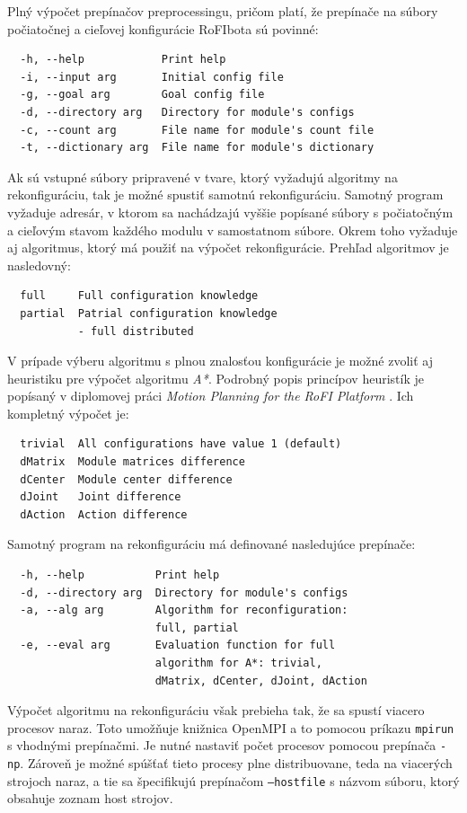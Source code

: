 \documentclass[
  digital, %
  oneside, %
  table,   %
  lof,     %
  nolot,     %
]{fithesis3}
\begin{document}
Plný výpočet prepínačov preprocessingu, pričom platí, že prepínače na súbory počiatočnej a cieľovej konfigurácie RoFIbota sú povinné: 
\begin{verbatim}
  -h, --help            Print help
  -i, --input arg       Initial config file
  -g, --goal arg        Goal config file
  -d, --directory arg   Directory for module's configs
  -c, --count arg       File name for module's count file
  -t, --dictionary arg  File name for module's dictionary
\end{verbatim}

Ak sú vstupné súbory pripravené v tvare, ktorý vyžadujú algoritmy na rekonfiguráciu, tak je možné spustiť samotnú rekonfiguráciu. Samotný program vyžaduje adresár, v ktorom sa nachádzajú vyššie popísané súbory s počiatočným a cieľovým stavom každého modulu v samostatnom súbore. Okrem toho vyžaduje aj algoritmus, ktorý má použiť na výpočet rekonfigurácie. Prehľad algoritmov je nasledovný: 

\begin{verbatim}
  full     Full configuration knowledge
  partial  Patrial configuration knowledge 
           - full distributed
\end{verbatim}

V prípade výberu algoritmu s plnou znalosťou konfigurácie je možné zvoliť aj heuristiku pre výpočet algoritmu \textit{A*}. Podrobný popis princípov heuristík je popísaný v diplomovej práci \textit{Motion Planning for the RoFI Platform} \cite{vozarovaMasterThesis}. Ich kompletný výpočet je: 

\begin{verbatim}
  trivial  All configurations have value 1 (default)
  dMatrix  Module matrices difference
  dCenter  Module center difference
  dJoint   Joint difference
  dAction  Action difference
\end{verbatim}

Samotný program na rekonfiguráciu má definované nasledujúce prepínače: 

\begin{verbatim}
  -h, --help           Print help
  -d, --directory arg  Directory for module's configs
  -a, --alg arg        Algorithm for reconfiguration: 
                       full, partial
  -e, --eval arg       Evaluation function for full 
                       algorithm for A*: trivial, 
                       dMatrix, dCenter, dJoint, dAction
\end{verbatim}

Výpočet algoritmu na rekonfiguráciu však prebieha tak, že sa spustí viacero procesov naraz. Toto umožňuje knižnica OpenMPI a to pomocou príkazu \texttt{mpirun} s vhodnými prepínačmi. Je nutné nastaviť počet procesov pomocou prepínača \texttt{-np}. Zároveň je možné spúšťať tieto procesy plne distribuovane, teda na viacerých strojoch naraz, a tie sa špecifikujú prepínačom \texttt{--hostfile} \cite{openMPIHostFile} s názvom súboru, ktorý obsahuje zoznam host strojov. 
\end{document}
